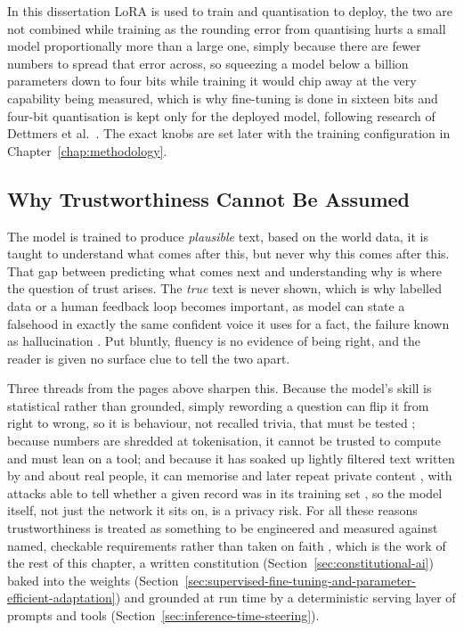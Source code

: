 In this dissertation LoRA is used to train and quantisation to deploy, the two are not combined while training as the rounding error from quantising hurts a small model proportionally more than a large one, simply because there are fewer numbers to spread that error across, so squeezing a model below a billion parameters down to four bits while training it would chip away at the very capability being measured, which is why fine-tuning is done in sixteen bits and four-bit quantisation is kept only for the deployed model, following research of Dettmers et al.\ \cite{dettmers2023qloraefficientfinetuningquantized}. The exact knobs are set later with the training configuration in Chapter~\ref{chap:methodology}.


\subsection{Why Trustworthiness Cannot Be Assumed}
\label{subsec:why-trustworthiness}

The model is trained to produce \emph{plausible} text, based on the world data, it is taught to understand what comes after this, but never why this comes after this. That gap between predicting what comes next and understanding why is where the question of trust arises. The \emph{true} text is never shown, which is why labelled data or a human feedback loop becomes important, as model can state a falsehood in exactly the same confident voice it uses for a fact, the failure known as hallucination \cite{ji2024surveyhallucinationnaturallanguage}. Put bluntly, fluency is no evidence of being right, and the reader is given no surface clue to tell the two apart.

Three threads from the pages above sharpen this. Because the model's skill is statistical rather than grounded, simply rewording a question can flip it from right to wrong, so it is behaviour, not recalled trivia, that must be tested \cite{salido2025othersgeneraltechniquedistinguish}; because numbers are shredded at tokenisation, it cannot be trusted to compute and must lean on a tool; and because it has soaked up lightly filtered text written by and about real people, it can memorise and later repeat private content \cite{carlini2021extractingtrainingdatalarge}, with attacks able to tell whether a given record was in its training set \cite{shokri2017membershipinferenceattacksmachine}, so the model itself, not just the network it sits on, is a privacy risk. For all these reasons trustworthiness is treated as something to be engineered and measured against named, checkable requirements rather than taken on faith \cite{huang2024trustllmtrustworthinesslargelanguage, euhleg2019}, which is the work of the rest of this chapter, a written constitution (Section~\ref{sec:constitutional-ai}) baked into the weights (Section~\ref{sec:supervised-fine-tuning-and-parameter-efficient-adaptation}) and grounded at run time by a deterministic serving layer of prompts and tools (Section~\ref{sec:inference-time-steering}).


